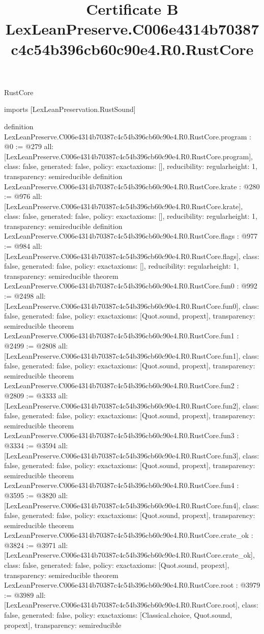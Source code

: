 \begin{lexlean}{RustCore}
\title{Certificate B LexLeanPreserve.C006e4314b70387c4c54b396cb60c90e4.R0.RustCore}
\begin{coremodule}
imports [LexLeanPreservation.RustSound]

definition LexLeanPreserve.C006e4314b70387c4c54b396cb60c90e4.R0.RustCore.program : @0 := @279 {
  all: [LexLeanPreserve.C006e4314b70387c4c54b396cb60c90e4.R0.RustCore.program],
  class: false,
  generated: false,
  policy: exact{axioms: []},
  reducibility: regular{height: 1},
  transparency: semireducible
}
definition LexLeanPreserve.C006e4314b70387c4c54b396cb60c90e4.R0.RustCore.krate : @280 := @976 {
  all: [LexLeanPreserve.C006e4314b70387c4c54b396cb60c90e4.R0.RustCore.krate],
  class: false,
  generated: false,
  policy: exact{axioms: []},
  reducibility: regular{height: 1},
  transparency: semireducible
}
definition LexLeanPreserve.C006e4314b70387c4c54b396cb60c90e4.R0.RustCore.flags : @977 := @984 {
  all: [LexLeanPreserve.C006e4314b70387c4c54b396cb60c90e4.R0.RustCore.flags],
  class: false,
  generated: false,
  policy: exact{axioms: []},
  reducibility: regular{height: 1},
  transparency: semireducible
}
theorem LexLeanPreserve.C006e4314b70387c4c54b396cb60c90e4.R0.RustCore.fun0 : @992 := @2498 {
  all: [LexLeanPreserve.C006e4314b70387c4c54b396cb60c90e4.R0.RustCore.fun0],
  class: false,
  generated: false,
  policy: exact{axioms: [Quot.sound, propext]},
  transparency: semireducible
}
theorem LexLeanPreserve.C006e4314b70387c4c54b396cb60c90e4.R0.RustCore.fun1 : @2499 := @2808 {
  all: [LexLeanPreserve.C006e4314b70387c4c54b396cb60c90e4.R0.RustCore.fun1],
  class: false,
  generated: false,
  policy: exact{axioms: [Quot.sound, propext]},
  transparency: semireducible
}
theorem LexLeanPreserve.C006e4314b70387c4c54b396cb60c90e4.R0.RustCore.fun2 : @2809 := @3333 {
  all: [LexLeanPreserve.C006e4314b70387c4c54b396cb60c90e4.R0.RustCore.fun2],
  class: false,
  generated: false,
  policy: exact{axioms: [Quot.sound, propext]},
  transparency: semireducible
}
theorem LexLeanPreserve.C006e4314b70387c4c54b396cb60c90e4.R0.RustCore.fun3 : @3334 := @3594 {
  all: [LexLeanPreserve.C006e4314b70387c4c54b396cb60c90e4.R0.RustCore.fun3],
  class: false,
  generated: false,
  policy: exact{axioms: [Quot.sound, propext]},
  transparency: semireducible
}
theorem LexLeanPreserve.C006e4314b70387c4c54b396cb60c90e4.R0.RustCore.fun4 : @3595 := @3820 {
  all: [LexLeanPreserve.C006e4314b70387c4c54b396cb60c90e4.R0.RustCore.fun4],
  class: false,
  generated: false,
  policy: exact{axioms: [Quot.sound, propext]},
  transparency: semireducible
}
theorem LexLeanPreserve.C006e4314b70387c4c54b396cb60c90e4.R0.RustCore.crate_ok : @3824 := @3971 {
  all: [LexLeanPreserve.C006e4314b70387c4c54b396cb60c90e4.R0.RustCore.crate_ok],
  class: false,
  generated: false,
  policy: exact{axioms: [Quot.sound, propext]},
  transparency: semireducible
}
theorem LexLeanPreserve.C006e4314b70387c4c54b396cb60c90e4.R0.RustCore.root : @3979 := @3989 {
  all: [LexLeanPreserve.C006e4314b70387c4c54b396cb60c90e4.R0.RustCore.root],
  class: false,
  generated: false,
  policy: exact{axioms: [Classical.choice, Quot.sound, propext]},
  transparency: semireducible
}


\end{coremodule}
\end{lexlean}
